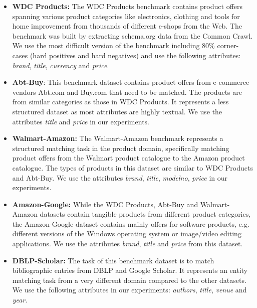 \documentclass[sigconf,nonacm]{acmart}
\begin{document}
\begin{itemize}
    \item \textbf{WDC Products:} The WDC Products benchmark contains product offers spanning various product categories like electronics, clothing and tools for home improvement from thousands of different e-shops from the Web. The benchmark was built by extracting schema.org data from the Common Crawl. We use the most difficult version of the benchmark including 80\% corner-cases (hard positives and hard negatives) and use the following attributes: \textit{brand}, \textit{title}, \textit{currency} and \textit{price}.
    \item \textbf{Abt-Buy}: This benchmark dataset contains product offers from e-commerce vendors Abt.com and Buy.com that need to be matched. The products are from similar categories as those in WDC Products. It represents a less structured dataset as most attributes are highly textual. We use the attributes \textit{title} and \textit{price} in our experiments.
    \item \textbf{Walmart-Amazon:} The Walmart-Amazon benchmark represents a structured matching task in the product domain, specifically matching product offers from the Walmart product catalogue to the Amazon product catalogue. The types of products in this dataset are similar to WDC Products and Abt-Buy. We use the attributes \textit{brand}, \textit{title}, \textit{modelno}, \textit{price} in our experiments.
    \item \textbf{Amazon-Google:} While the WDC Products, Abt-Buy and Walmart-Amazon datasets contain tangible products from different product categories, the Amazon-Google dataset contains mainly offers for software products, e.g. different versions of the Windows operating system or image/video editing applications. We use the attributes \textit{brand}, \textit{title} and \textit{price} from this dataset.
    \item \textbf{DBLP-Scholar:} The task of this benchmark dataset is to match bibliographic entries from DBLP and Google Scholar. It represents an entity matching task from a very different domain compared to the other datasets. We use the following attributes in our experiments: \textit{authors}, \textit{title}, \textit{venue} and \textit{year}. 
\end{itemize}
\end{document}
